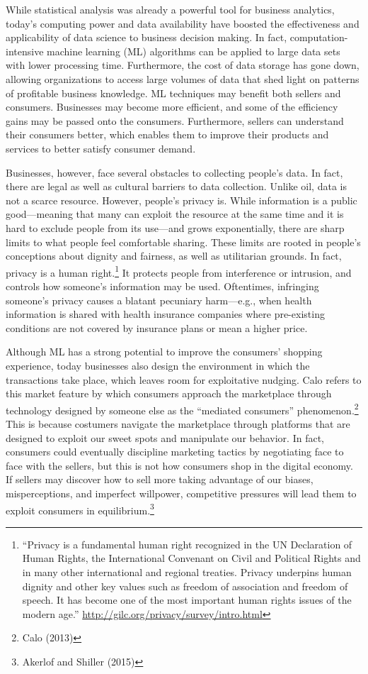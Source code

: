 \documentclass[
  11pt,
  letterpaper,
]{article}
\begin{document}
While statistical analysis was already a powerful tool for business analytics, today's computing power and data availability have boosted the effectiveness and applicability of data science to business decision making. In fact, computation-intensive machine learning (ML) algorithms can be applied to large data sets with lower processing time. Furthermore, the cost of data storage has gone down, allowing organizations to access large volumes of data that shed light on patterns of profitable business knowledge. ML techniques may benefit both sellers and consumers. Businesses may become more efficient, and some of the efficiency gains may be passed onto the consumers. Furthermore, sellers can understand their consumers better, which enables them to improve their products and services to better satisfy consumer demand.

Businesses, however, face several obstacles to collecting people's data. In fact, there are legal as well as cultural barriers to data collection. Unlike oil, data is not a scarce resource. However, people's privacy is. While information is a public good---meaning that many can exploit the resource at the same time and it is hard to exclude people from its use---and grows exponentially, there are sharp limits to what people feel comfortable sharing. These limits are rooted in people's conceptions about dignity and fairness, as well as utilitarian grounds. In fact, privacy is a human right.\footnote{``Privacy is a fundamental human right recognized in the UN Declaration of Human Rights, the International Convenant on Civil and Political Rights and in many other international and regional treaties. Privacy underpins human dignity and other key values such as freedom of association and freedom of speech. It has become one of the most important human rights issues of the modern age.'' \url{http://gilc.org/privacy/survey/intro.html}} It protects people from interference or intrusion, and controls how someone's information may be used. Oftentimes, infringing someone's privacy causes a blatant pecuniary harm---e.g., when health information is shared with health insurance companies where pre-existing conditions are not covered by insurance plans or mean a higher price.

Although ML has a strong potential to improve the consumers' shopping experience, today businesses also design the environment in which the transactions take place, which leaves room for exploitative nudging. Calo refers to this market feature by which consumers approach the marketplace through technology designed by someone else as the ``mediated consumers'' phenomenon.\footnote{Calo (2013)} This is because costumers navigate the marketplace through platforms that are designed to exploit our sweet spots and manipulate our behavior. In fact, consumers could eventually discipline marketing tactics by negotiating face to face with the sellers, but this is not how consumers shop in the digital economy. If sellers may discover how to sell more taking advantage of our biases, misperceptions, and imperfect willpower, competitive pressures will lead them to exploit consumers in equilibrium.\footnote{Akerlof and Shiller (2015)}
\end{document}
